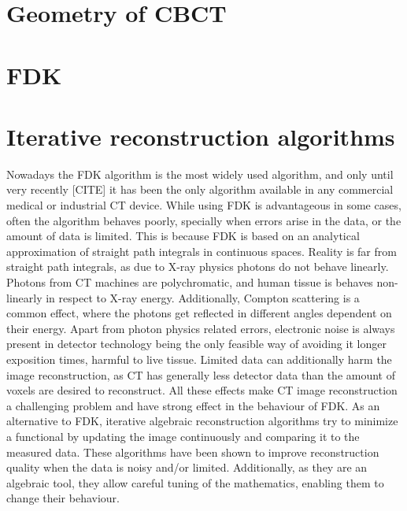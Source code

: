 \section{Geometry of CBCT}

\section{FDK}

\section{Iterative reconstruction algorithms}
Nowadays the FDK algorithm is the most widely used algorithm, and only until very recently [CITE] it has been the only algorithm available in any commercial medical or industrial CT device. While using FDK is advantageous in some cases, often the algorithm behaves poorly, specially when errors arise in the data, or the amount of data is limited. This is because FDK is based on an analytical approximation of straight path integrals in continuous spaces. Reality is far from straight path integrals, as due to X-ray physics photons do not behave linearly. Photons from CT machines are polychromatic, and human tissue is behaves non-linearly in respect to X-ray energy. Additionally, Compton scattering is a common effect, where the photons get reflected in different angles dependent on their energy. Apart from photon physics related errors, electronic noise is always present in detector technology being the only feasible way of avoiding it longer exposition times, harmful to live tissue. Limited data can additionally harm the image reconstruction, as CT has generally less detector data than the amount of  voxels are desired to reconstruct. All these effects make CT image reconstruction a challenging problem and have strong effect in the behaviour of FDK. As an alternative to FDK, iterative algebraic reconstruction algorithms try to minimize a functional by updating the image continuously and comparing it to the measured data. These algorithms have been shown to improve reconstruction quality when the data is noisy and/or limited. Additionally, as they are an algebraic tool, they allow careful tuning of the mathematics, enabling them to change their behaviour.

